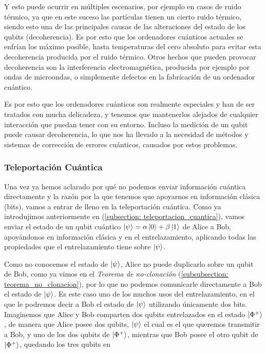 \documentclass[12pt]{article}
\numberwithin{equation}{section} %
\begin{document}
    \vspace{2.5mm}

    Y esto puede ocurrir en múltiples escenarios, por ejemplo en casos de ruido térmico, ya que en este suceso las partículas tienen un cierto ruido térmico, siendo esto una de las principales causas de las alteraciones del estado de los qubits (decoherencia). Es por esto que los ordenadores cuánticos actuales se enfrían los máximo posible, hasta temperaturas del cero absoluto para evitar esta decoherencia producida por el ruido térmico. Otros hechos que pueden provocar decoherencia son la interferencia electromagnética, producida por ejemplo por ondas de microondas, o simplemente defectos en la fabricación de un ordenador cuántico. 

    \vspace{5mm}

    Es por esto que los ordenadores cuánticos son realmente especiales y han de ser tratados con mucha delicadeza, y tenemos que mantenerlos alejados de cualquier interacción que puedan tener con su entorno. Incluso la medición de un qubit puede causar decoherencia, lo que nos ha llevado a la necesidad de métodos y sistemas de corrección de errores cuánticos, causados por estos problemas.

    \vspace{5mm}

    \subsubsection{Teleportación Cuántica}

    \vspace{5mm}

    Una vez ya hemos aclarado por qué no podemos enviar información cuántica directamente y la razón por la que tenemos que apoyarnos en información clásica (bits), vamos a entrar de lleno en la teleportación cuántica. Como ya introdujimos anteriormente en (\ref{subsection: teleportacion_cuantica}), vamos enviar el estado de un qubit cuántico \( \ket{\psi} = \alpha \ket{0} + \beta \ket{1} \) de Alice a Bob, apoyándonos en información clásica y en el entrelazamiento, aplicando todas las propiedades que el entrelazamiento tiene sobre \( \ket{\psi} \).

    \vspace{5mm}

    Como no conocemos el estado de \( \ket{\psi} \), Alice no puede duplicarlo sobre un qubit de Bob, como ya vimos en el \textit{Teorema de no-clonación} (\ref{subsubsection: teorema_no_clonacion}), por lo que no podemos comunicarle directamente a Bob el estado de \( \ket{\psi} \). Es este caso uno de los muchos usos del entrelazamiento, en el que le podremos decir a Bob el estado de \( \ket{\psi} \) utilizando únicamente dos bits. Imaginemos que Alice y Bob comparten dos qubits entrelazados en el estado \( \ket{\Phi^{+}} \), de manera que Alice posee dos qubits, \( \ket{\psi} \) el cual es el que queremos transmitir a Bob, y uno de los dos qubits de \( \ket{\Phi^{+}} \), mientras que Bob posee el otro qubit de \( \ket{\Phi^{+}} \), quedando los tres qubits en
\end{document}
